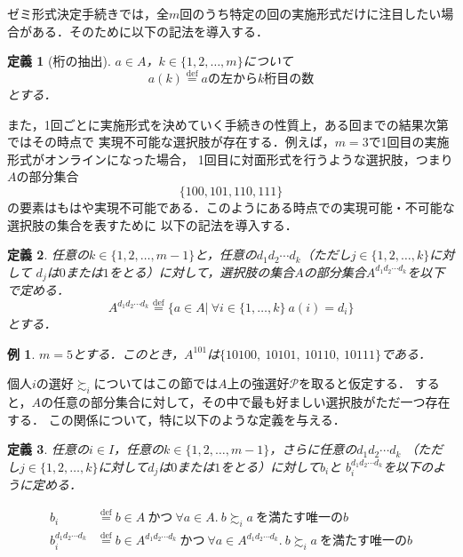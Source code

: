 \documentclass[dvipdfmx]{jsarticle}
\newtheorem{definition}{定義}
\newtheorem{example}{例}
\begin{document}
ゼミ形式決定手続きでは，全$m$回のうち特定の回の実施形式だけに注目したい場合がある．そのために以下の記法を導入する．

\begin{definition}[桁の抽出]
  $a \in A$，$k \in \{1,2,\ldots,m \}$について
  \[
    a(k) \stackrel{\mathrm{def}}{=} a\text{の左から}k\text{桁目の数}
  \]
  とする．
\end{definition}

また，1回ごとに実施形式を決めていく手続きの性質上，ある回までの結果次第ではその時点で
実現不可能な選択肢が存在する．例えば，$m=3$で1回目の実施形式がオンラインになった場合，
1回目に対面形式を行うような選択肢，つまり$A$の部分集合
\[
  \{100, 101, 110, 111 \}
\]
の要素はもはや実現不可能である．このようにある時点での実現可能・不可能な選択肢の集合を表すために
以下の記法を導入する．

\begin{definition}
  任意の$k \in \{1,2,\ldots,m-1\}$と，任意の$d_{1}d_{2}\cdots d_{k}$（ただし$j \in \{1,2,\ldots,k\}$に対して
  $d_j$は$0$または$1$をとる）に対して，選択肢の集合$A$の部分集合$A^{d_{1}d_{2}\cdots d_{k}}$を以下で定める．
  \[
    A^{d_{1}d_{2}\cdots d_{k}} \stackrel{\mathrm{def}}{=} \{a \in A |\ 
      \forall i \in \{1,\ldots,k\} \ a(i) = d_i \}
  \]
  とする．
\end{definition}


\begin{example}
  $m=5$とする．このとき，$A^{101}$は$\{10100,\ 10101,\ 10110,\ 10111\}$である．
\end{example}

個人$i$の選好$\succsim_i$についてはこの節では$A$上の強選好$\mathcal{P}$を取ると仮定する．
すると，$A$の任意の部分集合に対して，その中で最も好ましい選択肢がただ一つ存在する．
この関係について，特に以下のような定義を与える．

\begin{definition}
  任意の$i \in I$，任意の$k \in \{1,2,\ldots,m-1\}$，さらに任意の$d_{1}d_{2}\cdots d_{k}$
  （ただし$j \in \{1,2,\ldots,k \}$に対して$d_j$は$0$または$1$をとる）に対して$b_{i}$と
  $b_{i}^{d_{1}d_{2}\cdots d_{k}}$を以下のように定める．

  \begin{align*}
    b_i &\stackrel{\mathrm{def}}{=} b \in A\ \text{かつ}\ \forall a \in A. \ b \succsim_i a\
    \text{を満たす唯一の}b \\
    b_{i}^{d_{1}d_{2}\cdots d_{k}} &\stackrel{\mathrm{def}}{=}
    b \in A^{d_{1}d_{2}\cdots d_{k}} \ \text{かつ}\ \forall a \in A^{d_{1}d_{2}\cdots d_{k}}.
    \ b \succsim_i a\ \text{を満たす唯一の}b
  \end{align*}
\end{definition}
\end{document}
